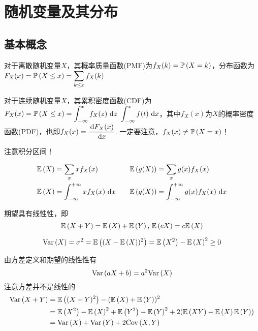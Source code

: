 
\section{随机变量及其分布}
\subsection{基本概念}
\begin{definition}
对于离散随机变量$X$，其概率质量函数(PMF)为$f_X(k)=\pr{X=k}$，分布函数为$\disp F_X(x)=\pr{X\leq x}=\sum_{k\leq x}f_X(k)$
\end{definition}
\begin{definition}
对于连续随机变量$X$，其累积密度函数(CDF)为$F_X(x)=\pr{X\leq x}=\intabu{-\infty}{x}{f_X(z)}{z}$
$\displaystyle \intab{-\infty}{x}{f(t)}$，其中$f_X(x)$为$X$的概率密度函数(PDF)，也即$f_X(x)=\dfrac{\diff F_X(x)}{\diff x}$.
一定要注意，$f_X(x)\ne\pr{X=x}$！
\end{definition}
注意积分区间！
\begin{definition}[期望]
\[\begin{aligned}
\E{X}&=\sum_x xf_X(x) \quad& \E{g(X)}&=\sum_x g(x)f_X(x)\\
\E{X}&=\intab{-\infty}{+\infty}{xf_X(x)} \quad& \E{g(X)}&=\intab{-\infty}{+\infty}{g(x)f_X(x)}
\end{aligned}\]
\end{definition}
\par 期望具有线性性，即
\[\E{X+Y}=\E{X}+\E{Y},\,\E{cX}=c\E{X}\]
\begin{definition}[方差]
\[\Var{X}=\sigma^2=\E{(X-\E{X})^2}=\E{X^2}-\E{X}^2\geq 0\]
\end{definition}
由方差定义和期望的线性性有
\[\Var{aX+b}=a^2\Var{X}\]
注意方差并不是线性的
\[\begin{aligned}
\Var{X+Y}&=\E{(X+Y)^2}-(\E{X}+\E{Y})^2\\
&=\E{X^2}-\E{X}^2+\E{Y^2}-\E{Y}^2+2(\E{XY}-\E{X}\E{Y})\\
&=\Var{X}+\Var{Y}+2\Cov{X,Y}
\end{aligned}\]

